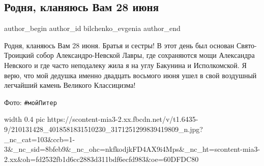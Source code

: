  
 
 
 
 
 
\subsection{Родня, кланяюсь Вам 28 июня}
\label{sec:29_06_2021.fb.bilchenko_evgenia.3.piter_lavra}
\ifcmt
 author_begin
   author_id bilchenko_evgenia
 author_end
\fi

Родня, кланяюсь Вам 28 июня. Братья и сестры! В этот день был основан
Свято-Троицкий собор Александро-Невской Лавры, где сохраняются мощи Александра
Невского и где часто неподалеку  жила я на углу Бакунина и Исполкомской. Я
верю, что мой дедушка именно двадцать восьмого июня ушел в свой воздушный
легчайший камень Великого Классицизма!

Фото: \verb|#мойПитер|

\ifcmt
	width 0.4
  pic https://scontent-mia3-2.xx.fbcdn.net/v/t1.6435-9/210131428_4018581831510230_3171251299839419809_n.jpg?_nc_cat=103&ccb=1-3&_nc_sid=8bfeb9&_nc_ohc=nkfkodjkFD4AX9i4Mps&_nc_ht=scontent-mia3-2.xx&oh=fd2532fb1d6cc2883d311bdf6ecfd983&oe=60DFDC80
\fi
